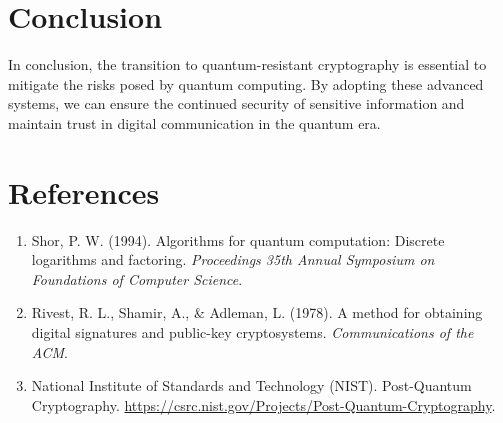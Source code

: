\documentclass[12pt,a4paper]{report}
\begin{document}
\chapter{Conclusion}
In conclusion, the transition to quantum-resistant cryptography is essential to mitigate the risks posed by quantum computing. By adopting these advanced systems, we can ensure the continued security of sensitive information and maintain trust in digital communication in the quantum era.

\chapter*{References}
\begin{enumerate}
    \item Shor, P. W. (1994). Algorithms for quantum computation: Discrete logarithms and factoring. \textit{Proceedings 35th Annual Symposium on Foundations of Computer Science}.
    \item Rivest, R. L., Shamir, A., \& Adleman, L. (1978). A method for obtaining digital signatures and public-key cryptosystems. \textit{Communications of the ACM}.
    \item National Institute of Standards and Technology (NIST). Post-Quantum Cryptography. \url{https://csrc.nist.gov/Projects/Post-Quantum-Cryptography}.
\end{enumerate}
\end{document}
